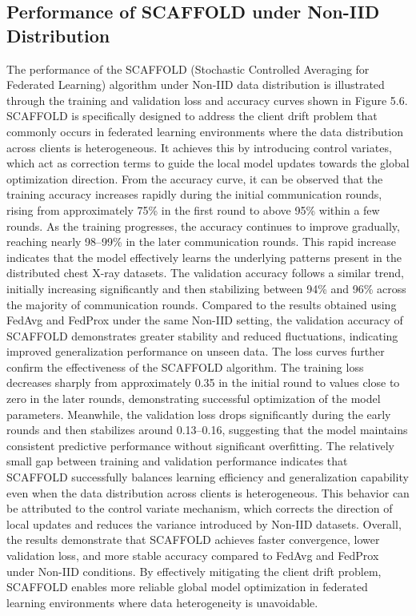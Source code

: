 \documentclass[12pt]{book}
\begin{document}
\subsection{ Performance of SCAFFOLD under Non-IID Distribution}
The performance of the SCAFFOLD (Stochastic Controlled Averaging for Federated Learning) algorithm under Non-IID data distribution is illustrated through the training and validation loss and accuracy curves shown in Figure 5.6. SCAFFOLD is specifically designed to address the client drift problem that commonly occurs in federated learning environments where the data distribution across clients is heterogeneous. It achieves this by introducing control variates, which act as correction terms to guide the local model updates towards the global optimization direction.
From the accuracy curve, it can be observed that the training accuracy increases rapidly during the initial communication rounds, rising from approximately 75\% in the first round to above 95\% within a few rounds. As the training progresses, the accuracy continues to improve gradually, reaching nearly 98–99\% in the later communication rounds. This rapid increase indicates that the model effectively learns the underlying patterns present in the distributed chest X-ray datasets.
The validation accuracy follows a similar trend, initially increasing significantly and then stabilizing between 94\% and 96\% across the majority of communication rounds. Compared to the results obtained using FedAvg and FedProx under the same Non-IID setting, the validation accuracy of SCAFFOLD demonstrates greater stability and reduced fluctuations, indicating improved generalization performance on unseen data.
The loss curves further confirm the effectiveness of the SCAFFOLD algorithm. The training loss decreases sharply from approximately 0.35 in the initial round to values close to zero in the later rounds, demonstrating successful optimization of the model parameters. Meanwhile, the validation loss drops significantly during the early rounds and then stabilizes around 0.13–0.16, suggesting that the model maintains consistent predictive performance without significant overfitting.
The relatively small gap between training and validation performance indicates that SCAFFOLD successfully balances learning efficiency and generalization capability even when the data distribution across clients is heterogeneous. This behavior can be attributed to the control variate mechanism, which corrects the direction of local updates and reduces the variance introduced by Non-IID datasets.
Overall, the results demonstrate that SCAFFOLD achieves faster convergence, lower validation loss, and more stable accuracy compared to FedAvg and FedProx under Non-IID conditions. By effectively mitigating the client drift problem, SCAFFOLD enables more reliable global model optimization in federated learning environments where data heterogeneity is unavoidable.
\end{document}
